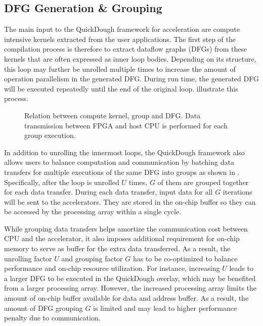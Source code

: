 \subsection{DFG Generation \& Grouping}
The main input to the QuickDough framework for acceleration are compute intensive kernels extracted from the user applications.  The first step of the compilation process is therefore to extract dataflow graphs (DFGs) from these kernels that are often expressed as inner loop bodies.
Depending on its structure, this loop may further be unrolled multiple times to increase the amount of operation parallelism in the generated DFG.  During run time, the generated DFG will be executed repeatedly until the end of the original loop.   illustrate this process.

\begin{figure}
\caption{Relation between compute kernel, group and DFG. Data transmission between FPGA and host CPU is
performed for each group execution.}
\label{fig:blocking-and-dfg-gen}
\end{figure}

In addition to unrolling the innermost loops, the QuickDough framework also allows users to balance computation and communication by batching data transfers for multiple executions of the same DFG into groups as shown in .
Specifically, after the loop is unrolled $U$ times, $G$ of them are grouped together for each data transfer.
During each data transfer, input data for all $G$ iterations will be sent to the accelerators.
They are stored in the on-chip buffer so they can be accessed by the processing array within a single cycle.

While grouping data transfers helps amortize the communication cost between CPU and the accelerator, it also imposes additional requirement for on-chip memory to serve as buffer for the extra data transferred.
As a result, the unrolling factor $U$ and grouping factor $G$ has to be co-optimized to balance performance and on-chip resource utilization.
For instance, increasing $U$ leads to a larger DFG to be executed in the QuickDough overlay, which may be benefited from a larger processing array.  However, the increased processing array limits the amount of on-chip buffer available for data and address buffer.  As a result, the amount of DFG grouping $G$ is limited and may lead to higher performance penalty due to communication.


